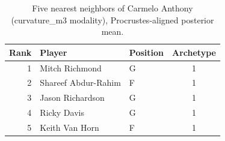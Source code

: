 \begin{table}[htbp]
  \centering\small
  \begin{tabular}{rllc}
    \toprule
    Rank & Player & Position & Archetype \\
    \midrule
    1 & Mitch Richmond & G & 1 \\
    2 & Shareef Abdur-Rahim & F & 1 \\
    3 & Jason Richardson & G & 1 \\
    4 & Ricky Davis & G & 1 \\
    5 & Keith Van Horn & F & 1 \\
    \bottomrule
  \end{tabular}
  \caption{Five nearest neighbors of Carmelo Anthony (curvature_m3 modality), Procrustes-aligned posterior mean.}
  \label{tab:Carmelo_Anthony_neighbors_curvature_m3}
\end{table}

